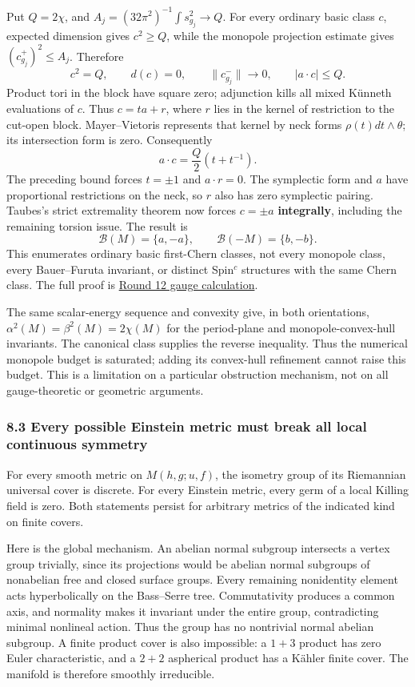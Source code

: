 \documentclass[
  english,
]{article}
\begin{document}
Put \(Q=2\chi\), and \(A_j=(32\pi^2)^{-1}\int s_{g_j}^2\to Q\). For
every ordinary basic class \(c\), expected dimension gives \(c^2\ge Q\),
while the monopole projection estimate gives \((c_{g_j}^+)^2\le A_j\).
Therefore \[
 c^2=Q,\qquad d(c)=0,\qquad \|c_{g_j}^-\|\to0,\qquad |a\cdot c|\le Q.
\] Product tori in the block have square zero; adjunction kills all
mixed Künneth evaluations of \(c\). Thus \(c=ta+r\), where \(r\) lies in
the kernel of restriction to the cut-open block. Mayer--Vietoris
represents that kernel by neck forms \(\rho(t)dt\wedge\theta\); its
intersection form is zero. Consequently \[
 a\cdot c=\frac Q2(t+t^{-1}).
\] The preceding bound forces \(t=\pm1\) and \(a\cdot r=0\). The
symplectic form and \(a\) have proportional restrictions on the neck, so
\(r\) also has zero symplectic pairing. Taubes's strict extremality
theorem now forces \(c=\pm a\) \textbf{integrally}, including the
remaining torsion issue. The result is \[
 \mathcal B(M)=\{a,-a\},\qquad \mathcal B(-M)=\{b,-b\}.
\] This enumerates ordinary basic first-Chern classes, not every
monopole class, every Bauer--Furuta invariant, or distinct Spin\(^{c}\)
structures with the same Chern class. The full proof is
\href{../proofs/round12_global.md}{Round 12 gauge calculation}.

The same scalar-energy sequence and convexity give, in both
orientations, \(\alpha^2(M)=\beta^2(M)=2\chi(M)\) for the period-plane
and monopole-convex-hull invariants. The canonical class supplies the
reverse inequality. Thus the numerical monopole budget is saturated;
adding its convex-hull refinement cannot raise this budget. This is a
limitation on a particular obstruction mechanism, not on all
gauge-theoretic or geometric arguments.

\hypertarget{every-possible-einstein-metric-must-break-all-local-continuous-symmetry}{%
\subsubsection{8.3 Every possible Einstein metric must break all local
continuous
symmetry}\label{every-possible-einstein-metric-must-break-all-local-continuous-symmetry}}

For every smooth metric on \(M(h,g;u,f)\), the isometry group of its
Riemannian universal cover is discrete. For every Einstein metric, every
germ of a local Killing field is zero. Both statements persist for
arbitrary metrics of the indicated kind on finite covers.

Here is the global mechanism. An abelian normal subgroup intersects a
vertex group trivially, since its projections would be abelian normal
subgroups of nonabelian free and closed surface groups. Every remaining
nonidentity element acts hyperbolically on the Bass--Serre tree.
Commutativity produces a common axis, and normality makes it invariant
under the entire group, contradicting minimal nonlineal action. Thus the
group has no nontrivial normal abelian subgroup. A finite product cover
is also impossible: a \(1+3\) product has zero Euler characteristic, and
a \(2+2\) aspherical product has a Kähler finite cover. The manifold is
therefore smoothly irreducible.
\end{document}

